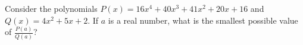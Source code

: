 Consider the polynomials $P\left(x\right)=16x^4+40x^3+41x^2+20x+16$ and $Q\left(x\right)=4x^2+5x+2$. If $a$ is a real number, what is the smallest possible value of $\frac{P\left(a\right)}{Q\left(a\right)}$?